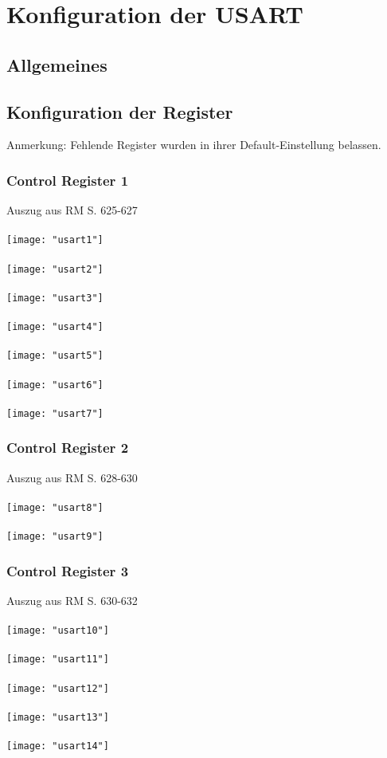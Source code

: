 \documentclass[11pt]{report}
\begin{document}
	\section{Konfiguration der USART}
		\subsection{Allgemeines}
		\subsection{Konfiguration der Register}
			Anmerkung: Fehlende Register wurden in ihrer Default-Einstellung belassen.
			\subsubsection{Control Register 1}
				Auszug aus RM S. 625-627\\
				\\\texttt{[image: "usart1"]}\\
				\\\texttt{[image: "usart2"]}\\
				\\\texttt{[image: "usart3"]}\\
				\\\texttt{[image: "usart4"]}\\
				\\\texttt{[image: "usart5"]}\\
				\\\texttt{[image: "usart6"]}\\
				\\\texttt{[image: "usart7"]}\\
			\subsubsection{Control Register 2}
				Auszug aus RM S. 628-630\\
				\\\texttt{[image: "usart8"]}\\
				\\\texttt{[image: "usart9"]}\\
			\subsubsection{Control Register 3}
				Auszug aus RM S. 630-632\\
				\\\texttt{[image: "usart10"]}\\
				\\\texttt{[image: "usart11"]}\\
				\\\texttt{[image: "usart12"]}\\
				\\\texttt{[image: "usart13"]}\\
				\\\texttt{[image: "usart14"]}\\
\end{document}
